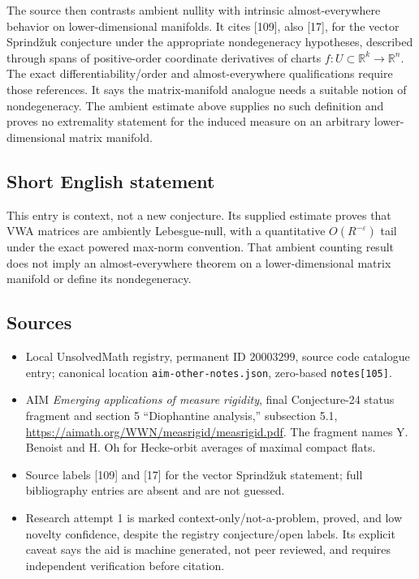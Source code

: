 \documentclass[11pt]{article}
\newcommand{\R}{\mathbb{R}}
\newcommand{\eps}{\varepsilon}
\begin{document}
The source then contrasts ambient nullity with intrinsic almost-everywhere behavior on lower-dimensional manifolds. It cites [109], also [17], for the vector Sprind\v{z}uk conjecture under the appropriate nondegeneracy hypotheses, described through spans of positive-order coordinate derivatives of charts $f:U\subset\R^k\to\R^n$. The exact differentiability/order and almost-everywhere qualifications require those references. It says the matrix-manifold analogue needs a suitable notion of nondegeneracy. The ambient estimate above supplies no such definition and proves no extremality statement for the induced measure on an arbitrary lower-dimensional matrix manifold.
\subsection{Short English statement}
This entry is context, not a new conjecture. Its supplied estimate proves that VWA matrices are ambiently Lebesgue-null, with a quantitative $O(R^{-\eps})$ tail under the exact powered max-norm convention. That ambient counting result does not imply an almost-everywhere theorem on a lower-dimensional matrix manifold or define its nondegeneracy.
\subsection{Sources}
\begin{itemize}
\item Local UnsolvedMath registry, permanent ID $20003299$, source code catalogue entry; canonical location \texttt{aim-other-notes.json}, zero-based \texttt{notes[105]}.
\item AIM \emph{Emerging applications of measure rigidity}, final Conjecture-24 status fragment and section 5 ``Diophantine analysis,'' subsection 5.1, \url{https://aimath.org/WWN/measrigid/measrigid.pdf}. The fragment names Y. Benoist and H. Oh for Hecke-orbit averages of maximal compact flats.
\item Source labels [109] and [17] for the vector Sprind\v{z}uk statement; full bibliography entries are absent and are not guessed.
\item Research attempt 1 is marked context-only/not-a-problem, proved, and low novelty confidence, despite the registry conjecture/open labels. Its explicit caveat says the aid is machine generated, not peer reviewed, and requires independent verification before citation.
\end{itemize}
\end{document}

